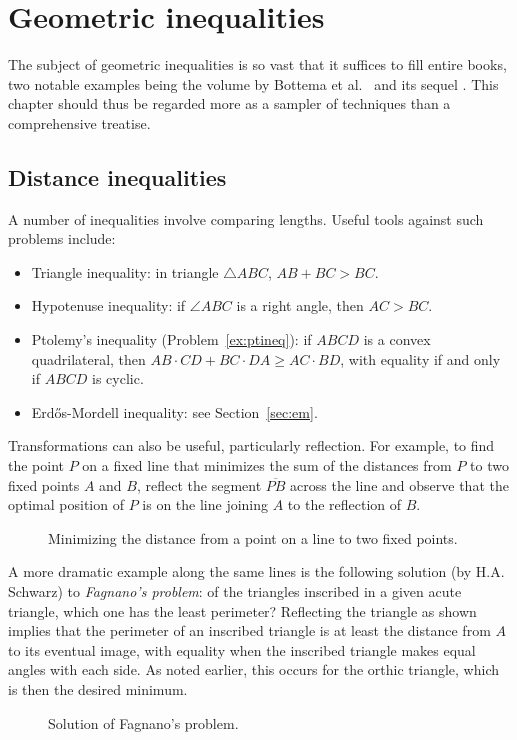 \documentclass[12pt]{book}
\numberwithin{exc}{section}
\numberwithin{figure}{section}
\numberwithin{equation}{theorem}
\def\ii{\item}
\def\ang{\angle}
\def\seg#1{\overline{#1}}
\begin{document}
\chapter{Geometric inequalities}

The subject of geometric inequalities is so vast that it suffices to 
fill entire books, two notable examples being the volume by Bottema et
al.\ \cite{bib:bott} and its sequel \cite{bib:rcige}.
This chapter should thus be regarded more as 
a sampler of techniques
than a comprehensive treatise.

\section{Distance inequalities}

A number of inequalities involve comparing lengths. Useful tools 
against such problems include:
\begin{itemize}
\ii {}
Triangle inequality: in triangle $\triangle ABC$, $AB + BC > BC$.
\ii
Hypotenuse inequality: if $\ang ABC$ is a right angle, then $AC > BC$.
\ii {} 
Ptolemy's inequality (Problem~\ref{ex:ptineq}):
if $ABCD$ is a convex quadrilateral, 
then
$AB \cdot CD + BC \cdot DA \geq AC \cdot BD$, with equality if and 
only if $ABCD$ is cyclic.
\ii {}
Erd\H{o}s-Mordell inequality: see Section~\ref{sec:em}.
\end{itemize}

Transformations can also be useful, particularly reflection. 
For example, to find the point $P$ on a fixed line 
that minimizes the sum of the distances from $P$ to two fixed points 
$A$ and $B$, reflect the segment $\seg{PB}$ across the line and observe that 
the optimal position of $P$ is on the line joining $A$ to the 
reflection of $B$. 
\begin{figure}[ht]
\caption{Minimizing the distance from a point on a line to two fixed
points.}
\end{figure}

A more dramatic example along the same lines is the following solution 
(by H.A. Schwarz)
to \emph{Fagnano's problem}: 
of the triangles inscribed in a given 
acute triangle, which one has the least perimeter? Reflecting the 
triangle as shown implies that the perimeter of an inscribed triangle 
is at least the distance from $A$ to its eventual image, with 
equality when the inscribed triangle makes equal angles with each 
side. As noted earlier, this occurs for the orthic triangle, which is 
then the desired minimum. 
\begin{figure}[ht]
\caption{Solution of Fagnano's problem.}
\end{figure}
\end{document}
